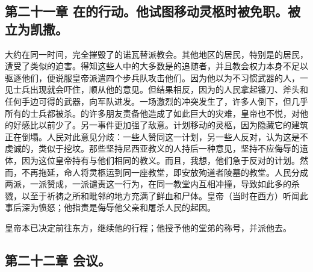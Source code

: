 
\subsection{第二十一章 在的行动。他试图移动灵柩时被免职。被立为凯撒。}

大约在同一时间，完全摧毁了的诺瓦替派教会。其他地区的居民，特别是的居民，遭受了类似的迫害。得知这些人中的大多数是的追随者，并且教会权力本身不足以驱逐他们，便说服皇帝派遣四个步兵队攻击他们。因为他以为不习惯武器的人，一见士兵出现就会吓住，顺从他的意见。但结果相反，因为的人民拿起镰刀、斧头和任何手边可得的武器，向军队进发。一场激烈的冲突发生了，许多人倒下，但几乎所有的士兵都被杀。的许多朋友责备他造成了如此巨大的灾难，皇帝也不悦，对他的好感比以前少了。另一事件更加强了敌意。计划移动的灵柩，因为隐藏它的建筑正在倒塌。人民对此意见分歧：一些人赞同这一计划，另一些人反对，认为这是不虔诚的，类似于挖坟。那些坚持尼西亚教义的人持后一种意见，坚持不应侮辱的遗体，因为这位皇帝持有与他们相同的教义。而且，我想，他们急于反对的计划。然而，不再拖延，命人将灵柩运到同一座教堂，即安放殉道者陵墓的教堂。人民分成两派，一派赞成，一派谴责这一行为，在同一教堂内互相冲撞，导致如此多的杀戮，以至于祈祷之所和毗邻的地方充满了鲜血和尸体。皇帝（当时在西方）听闻此事后深为愤怒；他指责是侮辱他父亲和屠杀人民的起因。\par

皇帝本已决定前往东方，继续他的行程；他授予他的堂弟的称号，并派他去。\par


\subsection{第二十二章 会议。}

